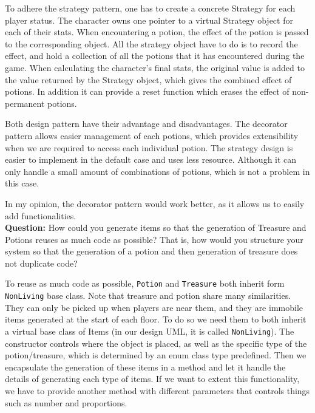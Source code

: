 \documentclass[11pt]{article}
\theoremstyle{plain} \newtheorem{theorem*}{Theorem}[subsection]
\begin{document}
To adhere the strategy pattern, one has to create a concrete Strategy for each
player status. The character owns one pointer to a virtual Strategy object for
each of their stats. When encountering a potion, the effect of the potion is
passed to the corresponding object. All the strategy object have to do is to
record the effect, and hold a collection of all the potions that it has
encountered during the game. When calculating the character’s final stats, the
original value is added to the value returned by the Strategy object, which
gives the combined effect of potions. In addition it can provide a reset
function which erases the effect of non-permanent potions.  

Both design pattern have their advantage and disadvantages. The decorator
pattern allows easier management of each potions, which provides extensibility
when we are required to access each individual potion. The strategy design is
easier to implement in the default case and uses less resource. Although it can
only handle a small amount of combinations of potions, which is not a problem
in this case.  

In my opinion, the decorator pattern would work better, as it allows us to
easily add functionalities. \\

\textbf{Question:}
How could you generate items so that the generation of Treasure and Potions
reuses as much code as possible? That is, how would you structure your system
so that the generation of a potion and then generation of treasure does not
duplicate code? 

To reuse as much code as possible, \texttt{Potion} and \texttt{Treasure}
both inherit form \texttt{NonLiving} base class.
Note that treasure and potion share many similarities. They
can only be picked up when players are near them, and they are immobile items
generated at the start of each floor. To do so we need them to both inherit a
virtual base class of Items (in our design UML, it is called \texttt{NonLiving}). The
constructor controls where the object is placed, as well as the specific type
of the potion/treasure, which is determined by an enum class type predefined.
Then we encapsulate the generation of these items in a method and let it handle
the details of generating each type of items. If we want to extent this
functionality, we have to provide another method with different parameters that
controls things such as number and proportions. \\\\
\end{document}
